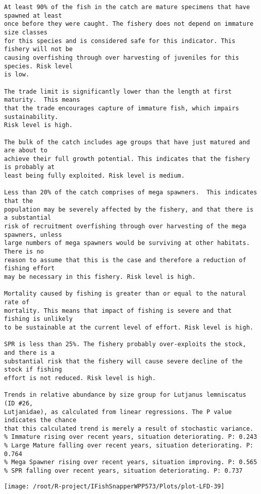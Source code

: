 \documentclass{report}\usepackage[]{graphicx}\usepackage[]{color}
\makeatletter
\def\maxwidth{ %
  \ifdim\Gin@nat@width>\linewidth
    \linewidth
  \else
    \Gin@nat@width
  \fi
}
\newenvironment{kframe}{%
 \def\at@end@of@kframe{}%
 \ifinner\ifhmode%
  \def\at@end@of@kframe{\end{minipage}}%
  \begin{minipage}{\columnwidth}%
 \fi\fi%
 \def\FrameCommand##1{\hskip\@totalleftmargin \hskip-\fboxsep
 \colorbox{shadecolor}{##1}\hskip-\fboxsep
     \hskip-\linewidth \hskip-\@totalleftmargin \hskip\columnwidth}%
 \MakeFramed {\advance\hsize-\width
   \@totalleftmargin\z@ \linewidth\hsize
   \@setminipage}}%
 {\par\unskip\endMakeFramed%
 \at@end@of@kframe}
\newenvironment{knitrout}{}{} %
\makeatother
\begin{document}
\begin{knitrout}
\begin{kframe}
\begin{verbatim}
At least 90% of the fish in the catch are mature specimens that have spawned at least
once before they were caught. The fishery does not depend on immature size classes
for this species and is considered safe for this indicator. This fishery will not be
causing overfishing through over harvesting of juveniles for this species. Risk level
is low.

The trade limit is significantly lower than the length at first maturity.  This means
that the trade encourages capture of immature fish, which impairs sustainability.
Risk level is high.

The bulk of the catch includes age groups that have just matured and are about to
achieve their full growth potential. This indicates that the fishery is probably at
least being fully exploited. Risk level is medium.

Less than 20% of the catch comprises of mega spawners.  This indicates that the
population may be severely affected by the fishery, and that there is a substantial
risk of recruitment overfishing through over harvesting of the mega spawners, unless
large numbers of mega spawners would be surviving at other habitats. There is no
reason to assume that this is the case and therefore a reduction of fishing effort
may be necessary in this fishery. Risk level is high.
 
Mortality caused by fishing is greater than or equal to the natural rate of
mortality. This means that impact of fishing is severe and that fishing is unlikely
to be sustainable at the current level of effort. Risk level is high.
 
SPR is less than 25%. The fishery probably over-exploits the stock, and there is a
substantial risk that the fishery will cause severe decline of the stock if fishing
effort is not reduced. Risk level is high.
 
Trends in relative abundance by size group for Lutjanus lemniscatus (ID #26,
Lutjanidae), as calculated from linear regressions. The P value indicates the chance
that this calculated trend is merely a result of stochastic variance.
% Immature rising over recent years, situation deteriorating. P: 0.243
% Large Mature falling over recent years, situation deteriorating. P: 0.764
% Mega Spawner rising over recent years, situation improving. P: 0.565
% SPR falling over recent years, situation deteriorating. P: 0.737
\end{verbatim}
\end{kframe}
\texttt{[image: /root/R-project/IFishSnapperWPP573/Plots/plot-LFD-39]} 


\end{knitrout}
\end{document}
